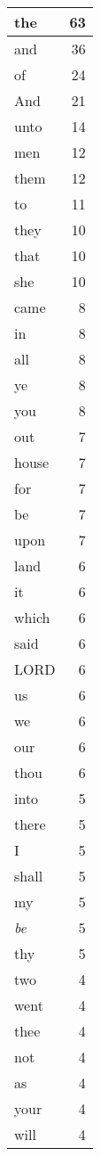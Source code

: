 \begin{center}
\begin{longtable}{l|r}
\hline \hline
\endlastfoot
the & 63 \\ \hline
and & 36 \\ \hline
of & 24 \\ \hline
And & 21 \\ \hline
unto & 14 \\ \hline
men & 12 \\ \hline
them & 12 \\ \hline
to & 11 \\ \hline
they & 10 \\ \hline
that & 10 \\ \hline
she & 10 \\ \hline
came & 8 \\ \hline
in & 8 \\ \hline
all & 8 \\ \hline
ye & 8 \\ \hline
you & 8 \\ \hline
out & 7 \\ \hline
house & 7 \\ \hline
for & 7 \\ \hline
be & 7 \\ \hline
upon & 7 \\ \hline
land & 6 \\ \hline
it & 6 \\ \hline
which & 6 \\ \hline
said & 6 \\ \hline
LORD & 6 \\ \hline
us & 6 \\ \hline
we & 6 \\ \hline
our & 6 \\ \hline
thou & 6 \\ \hline
into & 5 \\ \hline
there & 5 \\ \hline
I & 5 \\ \hline
shall & 5 \\ \hline
my & 5 \\ \hline
\emph{be} & 5 \\ \hline
thy & 5 \\ \hline
two & 4 \\ \hline
went & 4 \\ \hline
thee & 4 \\ \hline
not & 4 \\ \hline
as & 4 \\ \hline
your & 4 \\ \hline
will & 4 \\ \hline

\end{longtable}
\end{center}
